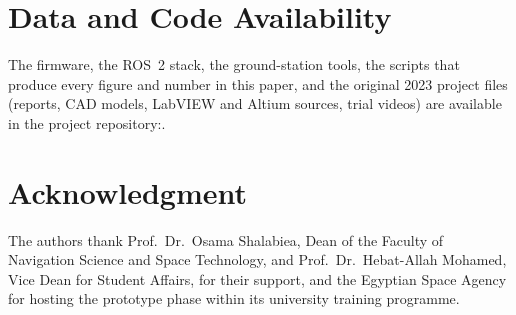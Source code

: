 \documentclass[conference]{IEEEtran}
\begin{document}
\section*{Data and Code Availability}
The firmware, the ROS~2 stack, the ground-station tools, the scripts that produce every figure and number in this paper, and the original 2023 project files (reports, CAD models, LabVIEW and Altium sources, trial videos) are available in the project repository:.

\section*{Acknowledgment}
The authors thank Prof.~Dr.~Osama Shalabiea, Dean of the Faculty of Navigation Science and Space Technology, and Prof.~Dr.~Hebat-Allah Mohamed, Vice Dean for Student Affairs, for their support, and the Egyptian Space Agency for hosting the prototype phase within its university training programme.



\end{document}
